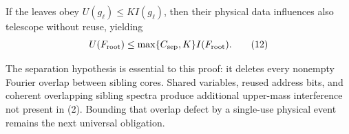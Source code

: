 If the leaves obey $U(g_\ell)\le K I(g_\ell)$, then their physical data
influences also telescope without reuse, yielding
\[
 U(F_{\rm root})\le\max\{C_{\rm sep},K\}I(F_{\rm root}).   \tag{12}
\]

The separation hypothesis is essential to this proof: it deletes every
nonempty Fourier overlap between sibling cores.  Shared variables, reused
address bits, and coherent overlapping sibling spectra produce additional
upper-mass interference not present in (2).  Bounding that overlap defect
by a single-use physical event remains the next universal obligation.
